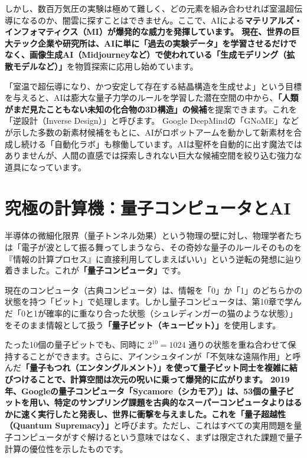 しかし、数百万気圧の実験は極めて難しく、どの元素を組み合わせれば室温超伝導になるのか、闇雲に探すことはできません。ここで、AIによる\textbf{マテリアルズ・インフォマティクス（MI）が爆発的な威力を発揮しています。 現在、世界の巨大テック企業や研究所は、AIに単に「過去の実験データ」を学習させるだけでなく、画像生成AI（Midjourneyなど）で使われている「生成モデリング（拡散モデルなど）」}を物質探索に応用し始めています。

「室温で超伝導になり、かつ安定して存在する結晶構造を生成せよ」という目標を与えると、AIは膨大な量子力学のルールを学習した潜在空間の中から、\textbf{「人類がまだ見たこともない未知の化合物の3D構造」の候補}を提案できます。これを「逆設計（Inverse Design）」と呼びます。 Google DeepMindの「GNoME」などが示した多数の新素材候補をもとに、AIがロボットアームを動かして新素材を合成し続ける「自動化ラボ」も稼働しています。AIは聖杯を自動的に出す魔法ではありませんが、人間の直感では探索しきれない巨大な候補空間を絞り込む強力な道具になっています。

\section{究極の計算機：量子コンピュータとAI}

半導体の微細化限界（量子トンネル効果）という物理の壁に対し、物理学者たちは「電子が波として振る舞ってしまうなら、その奇妙な量子のルールそのものを『情報の計算プロセス』に直接利用してしまえばいい」という逆転の発想に辿り着きました。これが\textbf{「量子コンピュータ」}です。

現在のコンピュータ（古典コンピュータ）は、情報を「0」か「1」のどちらかの状態を持つ「ビット」で処理します。しかし量子コンピュータは、第10章で学んだ「0と1が確率的に重なり合った状態（シュレディンガーの猫のような状態）」をそのまま情報として扱う\textbf{「量子ビット（キュービット）」}を使用します。

たった10個の量子ビットでも、同時に \(2^{10}=1024\) 通りの状態を重ね合わせて保持することができます。さらに、アインシュタインが「不気味な遠隔作用」と呼んだ\textbf{「量子もつれ（エンタングルメント）」を使って量子ビット同士を複雑に結びつけることで、計算空間は次元の呪いに乗って爆発的に広がります。 2019年、Googleの量子コンピュータ「Sycamore（シカモア）」は、53個の量子ビットを用い、特定のサンプリング課題を古典的なスーパーコンピュータよりはるかに速く実行したと発表し、世界に衝撃を与えました。これを「量子超越性（Quantum Supremacy）」}と呼びます。ただし、これはすべての実用問題を量子コンピュータがすぐ解けるという意味ではなく、まずは限定された課題で量子計算の優位性を示したものです。

